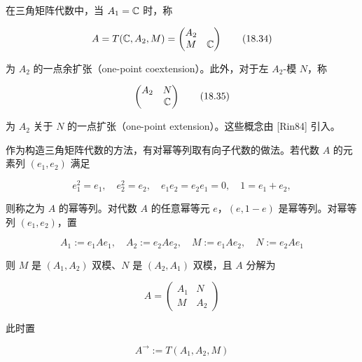 
在三角矩阵代数中，当 $A_1=\mathbb{C}$ 时，称

\begin{equation}
  A = T(\mathbb{C},A_2,M) = \begin{pmatrix} A_2 & \\ M & \mathbb{C} \end{pmatrix} \tag{18.34}
\end{equation}

为 $A_2$ 的一点余扩张（one-point coextension）。此外，对于左 $A_2$-模 $N$，称

\begin{equation}
  \begin{pmatrix} A_2 & N\\ & \mathbb{C} \end{pmatrix} \tag{18.35}
\end{equation}

为 $A_2$ 关于 $N$ 的一点扩张（one-point extension）。这些概念由 [Rin84] 引入。

作为构造三角矩阵代数的方法，有对幂等列取有向子代数的做法。若代数 $A$ 的元素列 $(e_1,e_2)$ 满足

\begin{equation}
  e_1^{2} = e_1,\quad e_2^{2} = e_2,\quad e_1e_2 = e_2e_1 = 0,\quad 1 = e_1+e_2, \tag{18.36}
\end{equation}

则称之为 $A$ 的幂等列。对代数 $A$ 的任意幂等元 $e$，$(e,1-e)$ 是幂等列。对幂等列 $(e_1,e_2)$，置

\begin{equation}
  A_1 := e_1Ae_1,\quad A_2 := e_2Ae_2,\quad M := e_1Ae_2,\quad N := e_2Ae_1 \tag{18.37}
\end{equation}

则 $M$ 是 $(A_1,A_2)$ 双模、$N$ 是 $(A_2,A_1)$ 双模，且 $A$ 分解为

\begin{equation}
  A = \begin{pmatrix} A_1 & N\\ M & A_2 \end{pmatrix} \tag{18.38}
\end{equation}

此时置

\begin{equation}
  A^{\to} := T(A_1,A_2,M) \tag{18.39}
\end{equation}

